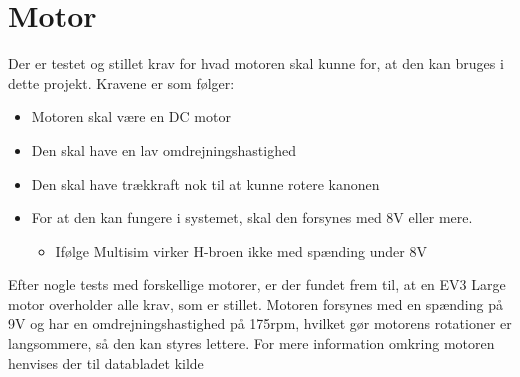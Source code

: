 \section{Motor}
Der er testet og stillet krav for hvad motoren skal kunne for, at den kan bruges i dette projekt. 
Kravene er som følger:
	\begin{itemize}
		\item	Motoren skal være en DC motor
		\item   Den skal have en lav omdrejningshastighed
		\item	Den skal have trækkraft nok til at kunne rotere kanonen
		\item	For at den kan fungere i systemet, skal den forsynes med 8V eller mere.
		\begin{itemize}
			\item Ifølge Multisim virker H-broen ikke med spænding under 8V
		\end{itemize}
	\end{itemize}
Efter nogle tests med forskellige motorer, er der fundet frem til, at en EV3 Large motor \cite{legoMotor} overholder alle krav, som er stillet. Motoren forsynes med en spænding på 9V og har en omdrejningshastighed på 175rpm, hvilket gør motorens rotationer er langsommere, så den kan styres lettere. For mere information omkring motoren henvises der til databladet kilde \cite{legoMotor}